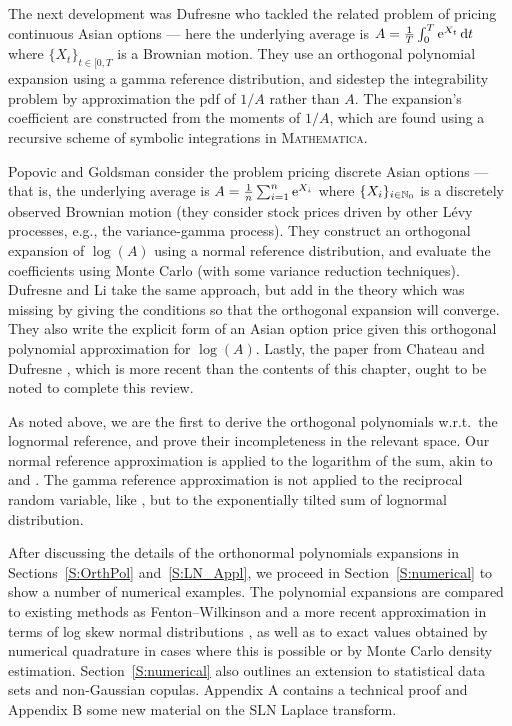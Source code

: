 The next development was Dufresne \cite{dufresne2000laguerre} who tackled the related problem of pricing continuous Asian options --- here the underlying average is $A = \frac1T \int_0^T \mathrm{e}^{X_t} \mathop{}\!\mathrm{d} t$ where $\{X_t\}_{t\in[0,T}$ is a Brownian motion. They use an orthogonal polynomial expansion using a gamma reference distribution, and sidestep the integrability problem by approximation the pdf of $1/A$ rather than $A$. The expansion's coefficient are constructed from the moments of $1/A$, which are found using a recursive scheme of symbolic integrations in \textsc{Mathematica}.

Popovic and Goldsman \cite{popovic2012easy} consider the problem pricing discrete Asian options --- that is, the underlying average is $A = \frac1n \sum_{i=1}^n \mathrm{e}^{X_i}$ where $\{X_i\}_{i\in\mathbb{N}_0}$ is a discretely observed Brownian motion (they consider stock prices driven by other L{\'e}vy processes, e.g., the variance-gamma process). They construct an orthogonal expansion of $\log(A)$ using a normal reference distribution, and evaluate the coefficients using Monte Carlo (with some variance reduction techniques). Dufresne and Li \cite{dufresne2016pricing} take the same approach, but add in the theory which was missing by giving the conditions so that the orthogonal expansion will converge. They also write the explicit form of an Asian option price given this orthogonal polynomial approximation for $\log(A)$. Lastly, the paper from Chateau and Dufresne \cite{chateau2017gram}, which is more recent than the contents of this chapter, ought to be noted to complete this review.

As noted above, we are the first to derive the orthogonal polynomials w.r.t.\ the lognormal reference, and prove their incompleteness in the relevant space. Our normal reference approximation is applied to the logarithm of the sum, akin to \cite{popovic2012easy} and \cite{dufresne2016pricing}. The gamma reference approximation is not applied to the reciprocal random variable, like \cite{dufresne2000laguerre}, but to the exponentially tilted sum of lognormal distribution.

After discussing the details of the orthonormal polynomials expansions in Sections~\ref{S:OrthPol} and~\ref{S:LN_Appl},
we proceed in Section~\ref{S:numerical} to show a number of numerical examples. The polynomial expansions
are compared to existing methods as Fenton--Wilkinson and a more recent approximation in terms of log skew normal
distributions \cite{hcine2015highly}, as well as to exact values obtained by numerical quadrature in cases where this
is possible or by Monte Carlo density estimation. Section~\ref{S:numerical} also outlines an extension to  statistical data sets and non-Gaussian copulas. Appendix A contains a technical proof
and Appendix B some new material on the SLN Laplace transform.

